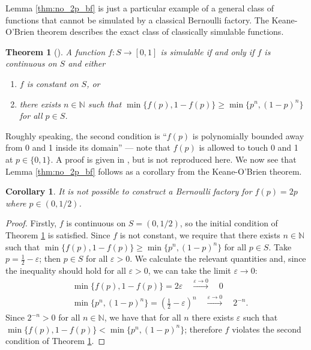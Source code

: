 \documentclass{article}
\newtheorem{thm}{Theorem}
\newtheorem{cor}{Corollary}
\theoremstyle{definition}
\begin{document}
Lemma \ref{thm:no_2p_bf} is just a particular example of a general class of functions that cannot be simulated by a classical Bernoulli factory. The Keane-O'Brien theorem describes the exact class of classically simulable functions.
\begin{thm}[\citet{keane1994}]\label{thm:KOB}
A function $f:S\to[0,1]$ is simulable if and only if $f$ is continuous on $S$ and either
\begin{enumerate}[label=(\alph*)]
\item $f$ is constant on $S$, or
\item there exists $n\in\mathbb{N}$ such that $\min\{f(p),1-f(p)\} \geq \min\{p^n, (1-p)^n\}$ for all $p\in S$.
\end{enumerate}
\end{thm}

Roughly speaking, the second condition is ``$f(p)$ is polynomially bounded away from 0 and 1 inside its domain'' --- note that $f(p)$ is allowed to touch 0 and 1 at $p\in\{0,1\}$. A proof is given in \citet{keane1994}, but is not reproduced here. We now see that Lemma \ref{thm:no_2p_bf} follows as a corollary from the Keane-O'Brien theorem.
\begin{cor}
It is not possible to construct a Bernoulli factory for $f(p)=2p$ where $p\in(0,1/2)$.
\end{cor}
\begin{proof}
Firstly, $f$ is continuous on $S=(0,1/2)$, so the initial condition of Theorem \ref{thm:KOB} is satisfied.
Since $f$ is not constant, we require that there exists $n\in\mathbb{N}$ such that $\min\{f(p),1-f(p)\} \geq \min\{p^n, (1-p)^n\}$ for all $p\in S$.
Take $p=\frac{1}{2} - \varepsilon$; then $p\in S$ for all $\varepsilon>0$.
We calculate the relevant quantities and, since the inequality should hold for all $\varepsilon>0$,  we can take the limit $\varepsilon\to 0$:
\begin{align*}
&\min\{f(p),1-f(p)\} = 2\varepsilon \quad \overset{\varepsilon\to 0}{\longrightarrow}\quad 0 \\
&\min\{p^n, (1-p)^n\} = \left( \frac{1}{2} - \varepsilon \right)^n \quad \overset{\varepsilon\to 0}{\longrightarrow}\quad 2^{-n}.
\end{align*}
Since $2^{-n} >0$ for all $n\in\mathbb{N}$, we have that for all $n$ there exists $\varepsilon$ such that $\min\{f(p),1-f(p)\} < \min\{p^n, (1-p)^n\}$; therefore $f$ violates the second condition of Theorem \ref{thm:KOB}.
\end{proof}
\end{document}

